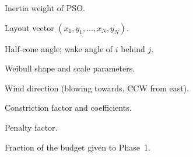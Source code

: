 \begin{IEEEdescription}
\item[$w$] Inertia weight of PSO.
\item[$\mathbf X$] Layout vector $(x_1,y_1,\ldots,x_N,y_N)$.
\item[$\alpha$, $\beta_{ij}$] Half-cone angle; wake angle of $i$ behind $j$.
\item[$\zeta$, $\psi$] Weibull shape and scale parameters.
\item[$\theta$] Wind direction (blowing towards, CCW from east).
\item[$\kappa$, $\varphi_{1,2}$] Constriction factor and coefficients.
\item[$\mu$] Penalty factor.
\item[$\omega$] Fraction of the budget given to Phase~1.
\end{IEEEdescription}
